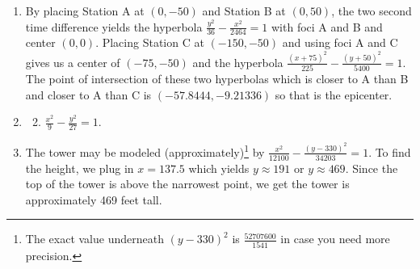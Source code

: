\documentclass{ximera}
\begin{document}
\begin{enumerate}
\setcounter{enumi}{\value{HW}}

\addtocounter{enumi}{1}

\item By placing Station A at $(0, -50)$ and Station B at $(0, 50)$, the two second time difference yields the hyperbola $\frac{y^{2}}{36} - \frac{x^{2}}{2464} = 1$ with foci A and B and center $(0, 0)$.  Placing Station C at $(-150, -50)$ and using foci A and C gives us a center of $(-75, -50)$ and the hyperbola $\frac{(x + 75)^{2}}{225} - \frac{(y + 50)^{2}}{5400} = 1$.  The point of intersection of these two hyperbolas which is closer to A than B and closer to A than C is $(-57.8444, -9.21336)$ so that is the epicenter.  

\item  \begin{enumerate} \setcounter{enumii}{1} \item $\frac{x^2}{9} - \frac{y^2}{27} = 1$. \end{enumerate}

\item  The tower may be modeled (approximately)\footnote{The exact value underneath $(y - 330)^{2}$ is $\frac{52707600}{1541}$ in case you need more precision.} by $\frac{x^2}{12100} - \frac{(y-330)^2}{34203} = 1$.  To find the height, we plug in $x = 137.5$ which yields $y \approx 191$ or $y \approx 469$.  Since the top of the tower is above the narrowest point, we get the tower is approximately 469 feet tall.

\end{enumerate}
\end{document}
